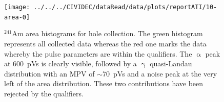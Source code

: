 \begin{figure}[]
\centering
\texttt{[image: ../../../CIVIDEC/dataRead/data/plots/reportATI/10-area-0]}
\caption{$^{241}$Am area histograms for hole collection. The green histogram represents all collected data whereas the red one marks the data whereby the pulse parameters are within the qualifiers. The $\upalpha$ peak at 600~pVs is clearly visible, followed by a $\upgamma$ quasi-Landau distribution with an MPV of $\sim$70~pVs and a noise peak at the very left of the area distribution. These two contributions have been rejected by the qualifiers.}
\label{fig:1dalphaareah}
\end{figure}
%
%
%
%
%
%


